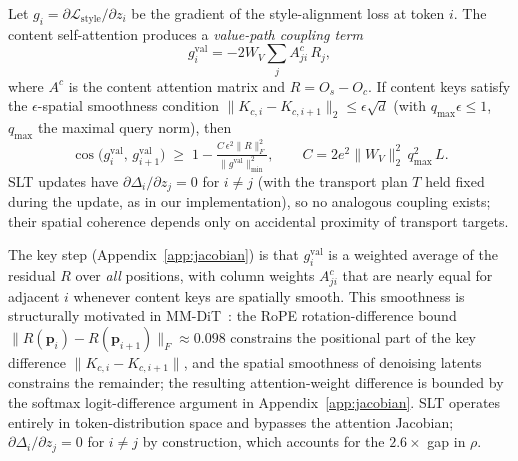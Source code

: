 \begin{proposition}
\label{prop:spatial}
Let $g_i = \partial\mathcal{L}_\mathrm{style}/\partial z_i$ be the gradient of
the style-alignment loss at token $i$.
The content self-attention produces a \emph{value-path coupling term}
\begin{equation}
  g_i^{\mathrm{val}}
  = -2W_V \sum_{j} A_{ji}^c\, R_j,
  \label{eq:gval}
\end{equation}
where $A^c$ is the content attention matrix and $R = O_s - O_c$.
If content keys satisfy the $\epsilon$-spatial smoothness condition
$\|K_{c,i} - K_{c,i+1}\|_2 \leq \epsilon\sqrt{d}$ (with
$q_{\max}\epsilon \leq 1$, $q_{\max}$ the maximal query norm), then
\begin{equation}
  \cos\!\bigl(g_i^{\mathrm{val}},\, g_{i+1}^{\mathrm{val}}\bigr)
  \;\geq\; 1 - \tfrac{C\,\epsilon^2\|R\|_F^2}{\|g^{\mathrm{val}}\|_{\min}^2},
  \qquad C = 2e^2\|W_V\|_2^2\,q_{\max}^2\,L.
  \label{eq:prop1}
\end{equation}
SLT updates have $\partial\Delta_i/\partial z_j = 0$ for $i \neq j$ (with the
transport plan $T$ held fixed during the update, as in our implementation),
so no analogous coupling exists; their spatial coherence depends only on
accidental proximity of transport targets.
\end{proposition}

The key step (Appendix~\ref{app:jacobian}) is that $g_i^{\mathrm{val}}$
is a weighted average of the residual $R$ over \emph{all} positions, with
column weights $A_{ji}^c$ that are nearly equal for adjacent $i$ whenever
content keys are spatially smooth.
This smoothness is structurally motivated in MM-DiT~\cite{esser2024scaling}:
the RoPE rotation-difference bound~\cite{su2024rope}
$\|R(\mathbf{p}_i){-}R(\mathbf{p}_{i+1})\|_F \approx 0.098$ constrains the
positional part of the key difference $\|K_{c,i}{-}K_{c,i+1}\|$, and the
spatial smoothness of denoising latents constrains the remainder; the
resulting attention-weight difference is bounded by the softmax
logit-difference argument in Appendix~\ref{app:jacobian}.
SLT operates entirely in token-distribution space and bypasses the attention
Jacobian; $\partial\Delta_i/\partial z_j = 0$ for $i \neq j$ by construction,
which accounts for the $2.6\times$ gap in $\rho$.

